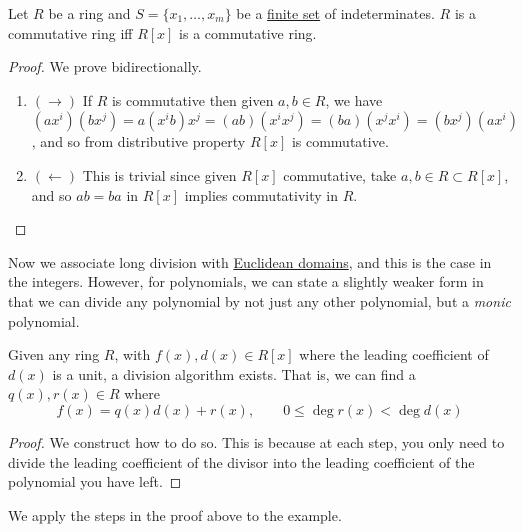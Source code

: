  \begin{theorem}
    \label{thm:conditions-for-rlbrackxrbrack-to-be-commutative}
    Let $R$ be a ring and $S = \{x_1, \ldots, x_m\}$ be a \hyperref[st-def:finite-set]{finite set} of indeterminates. $R$ is a commutative ring iff $R[x]$ is a commutative ring. 
  \end{theorem}
  \begin{proof}
    We prove bidirectionally. 
    \begin{enumerate}
      \item $(\rightarrow)$ If $R$ is commutative then given $a, b \in R$, we have $(ax^i) (b x^j) = a (x^i b) x^j = (ab)(x^i x^j) = (ba) (x^j x^i) = (b x^j) (a x^i)$, and so from distributive property $R[x]$ is commutative. 
      \item $(\leftarrow)$ This is trivial since given $R[x]$ commutative, take $a, b \in R \subset R[x]$, and so $ab = ba$ in $R[x]$ implies commutativity in $R$. 
    \end{enumerate}
  \end{proof}

  Now we associate long division with \hyperref[def:euclidean-domain]{Euclidean domains}, and this is the case in the integers. However, for polynomials, we can state a slightly weaker form in that we can divide any polynomial by not just any other polynomial, but a \textit{monic} polynomial. 

  \begin{theorem}
    \label{thm:poly-long-division}
    Given any ring $R$, with $f(x), d(x) \in R[x]$ where the leading coefficient of $d(x)$ is a unit, a division algorithm exists. That is, we can find a $q(x), r(x) \in R$ where 
    \begin{equation}
      f(x) = q(x) d(x) + r(x), \qquad 0 \leq \deg{r(x)} < \deg{d(x)}
    \end{equation}
  \end{theorem}
  \begin{proof}
    We construct how to do so. This is because at each step, you only need to divide the leading coefficient of the divisor into the leading coefficient of the polynomial you have left. 
  \end{proof}

  \begin{example}
    \label{ex:polynomial-long-division}
 
    We apply the steps in the proof above to the example. 
    \begin{center}
    \end{center}
  \end{example} 

